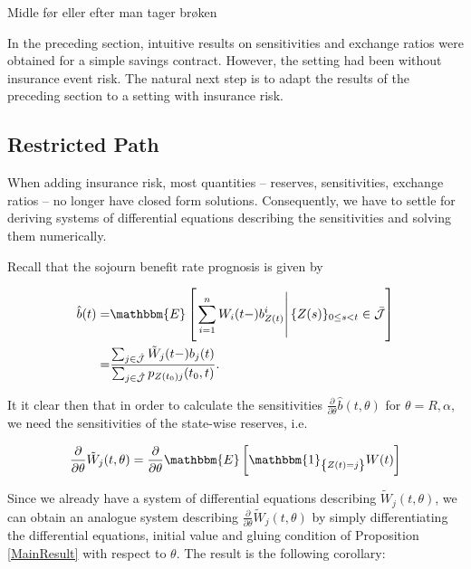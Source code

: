 \documentclass{article}
\newcommand{\1}[1]{\mathbbm{1}_{\left\lbrace #1 \right\rbrace}}
\newcommand{\expec}[1][def]{\mathbbm{E} \left[ #1 \right]}
\newcommand{\econd}[2][def]{\mathbbm{E} \left[ \left. #1 \right| #2 \right]}
\theoremstyle{break}
\theoremstyle{remark}
\newenvironment{remark}
  {\pushQED{\qed}\renewcommand{\qedsymbol}{\scalebox{1.4}{$\circ$}}\remarkx}
  {\popQED\endremarkx}
\numberwithin{equation}{section}
\begin{document}
\begin{remark}
	Midle før eller efter man tager brøken
\end{remark}

In the preceding section, intuitive results on sensitivities and exchange ratios were obtained for a simple savings contract. However, the setting had been without insurance event risk. The natural next step is to adapt the results of the preceding section to a setting with insurance risk.

\newpage
\subsection{Restricted Path}

When adding insurance risk, most quantities -- reserves, sensitivities, exchange ratios -- no longer have closed form solutions. Consequently, we have to settle for deriving systems of differential equations describing the sensitivities and solving them numerically.

Recall that the sojourn benefit rate prognosis is given by

\begin{align*}
	\hat{b}(t)=& \econd[\sum_{i=1}^n W_i(t-)b_{Z(t)}^i]{\{Z(s) \}_{0 \leq s < t} \in \bar{\mathcal{J}}} \\
	=& \frac{\sum_{j \in \hat{\mathcal{J}}} \tilde{W}_j(t-) b_j(t)}{\sum_{j \in \hat{\mathcal{J}}} p_{Z(t_0)j}(t_0,t)}.
\end{align*}

It it clear then that in order to calculate the sensitivities $\frac{\partial}{\partial \theta} \hat{b}(t,\theta)$ for $\theta=R,\alpha$, we need the sensitivities of the state-wise reserves, i.e.

\begin{align*}
	\frac{\partial}{\partial \theta} \tilde{W}_j(t,\theta) = \frac{\partial}{\partial \theta} \expec[\1{Z(t)=j} W(t)]
\end{align*}

Since we already have a system of differential equations describing $\tilde{W}_j(t,\theta)$, we can obtain an analogue system describing $\frac{\partial}{\partial \theta} \tilde{W}_j(t,\theta)$ by simply differentiating the differential equations, initial value and gluing condition of Proposition \ref{MainResult} with respect to $\theta$. The result is the following corollary:
\end{document}
